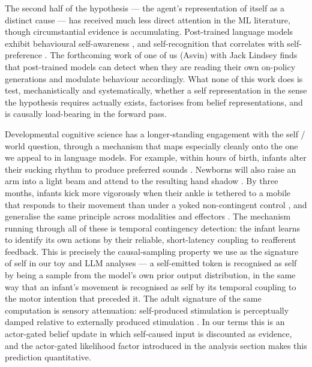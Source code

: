 \documentclass[11pt]{article}
\begin{document}
The second half of the hypothesis --- the agent's representation of itself as a distinct cause --- has received much less direct attention in the ML literature, though circumstantial evidence is accumulating. Post-trained language models exhibit behavioural self-awareness \citep{betley2025tellme}, and self-recognition that correlates with self-preference \citep{panickssery2024self}. The forthcoming work of one of us (Asvin) with Jack Lindsey finds that post-trained models can detect when they are reading their own on-policy generations and modulate behaviour accordingly. What none of this work does is test, mechanistically and systematically, whether a self representation in the sense the hypothesis requires actually exists, factorises from belief representations, and is causally load-bearing in the forward pass.

Developmental cognitive science has a longer-standing engagement with the self / world question, through a mechanism that maps especially cleanly onto the one we appeal to in language models. For example,  within hours of birth, infants alter their sucking rhythm to produce preferred sounds \citep{decasper2009lateralized}. Newborns will also raise an arm into a light beam and attend to the resulting hand shadow \citep{vandermeer1997limelight}. By three months, infants kick more vigorously when their ankle is tethered to a mobile that responds to their movement than under a yoked non-contingent control \citep{rovee1969conjugate}, and generalise the same principle across modalities and effectors \citep{lee2013contingent}. The mechanism running through all of these is temporal contingency detection: the infant learns to identify its own actions by their reliable, short-latency coupling to reafferent feedback. This is precisely the causal-sampling property we use as the signature of self in our toy and LLM analyses --- a self-emitted token is recognised as self by being a sample from the model's own prior output distribution, in the same way that an infant's movement is recognised as self by its temporal coupling to the motor intention that preceded it. The adult signature of the same computation is sensory attenuation: self-produced stimulation is perceptually damped relative to externally produced stimulation \citep{blakemore1998tickle}. In our terms this is an actor-gated belief update in which self-caused input is discounted as evidence, and the actor-gated likelihood factor introduced in the analysis section makes this prediction quantitative.
\end{document}
